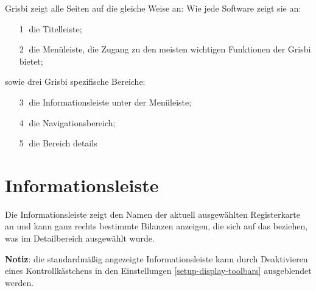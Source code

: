 Grisbi zeigt alle Seiten auf die gleiche Weise an: Wie jede Software zeigt sie an:%

\begin{itemize}%
	\item[\large\textcircled{\small 1}] die Titelleiste;%
	\item[\large\textcircled{\small 2}] die Menüleiste, die Zugang zu den meisten wichtigen Funktionen der Grisbi bietet;%
\end{itemize}
sowie drei Grisbi spezifische Bereiche:%
\begin{itemize}%
	\item[\large\textcircled{\small 3}] die Informationsleiste unter der Menüleiste;%
	\item[\large\textcircled{\small 4}] die Navigationsbereich;%
	\item[\large\textcircled{\small 5}] die Bereich details%
\end{itemize}

\section{Informationsleiste\label{home-synthesis}}

Die Informationsleiste zeigt den Namen der aktuell ausgewählten Registerkarte an und kann ganz rechts bestimmte Bilanzen anzeigen, die sich auf das beziehen, was im Detailbereich ausgewählt wurde.%


\textbf{Notiz}: die standardmäßig angezeigte Informationsleiste kann durch Deaktivieren eines Kontrollkästchens in den Einstellungen \vref{setup-display-toolbars} ausgeblendet werden.%

